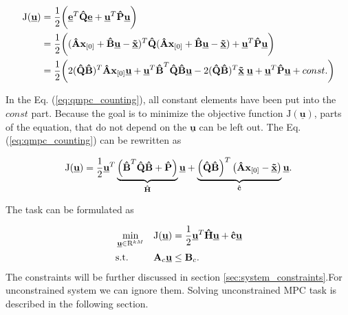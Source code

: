 \documentclass[a4paper,11pt,titlepage]{article}
\newcommand{\uvec}{\textbf{\underline{u}}}
\begin{document}
\begin{equation}
\begin{split}
\label{eq:qmpc_counting}
\mathrm{J}(\underline{\textbf{u}}) 
&= \frac{1}{2}\bigg(\underline{\textbf{e}}^T 
\textbf{\^Q} \underline{\textbf{e}}+\underline{\textbf{u}}^T 
\textbf{\^P} \underline{\textbf{u}}\bigg)\\
&=\frac{1}{2}\bigg((\textbf{\^A}\textbf{x}_{[0]} + \textbf{\^B}	  \uvec-\underline{\textbf{\~x}})^T 
\textbf{\^Q}
(\textbf{\^A}\textbf{x}_{[0]} + \textbf{\^B}\uvec-\underline{\textbf{\~x}}) 
+\underline{\textbf{u}}^T 
\textbf{\^P} \underline{\textbf{u}}\bigg)\\
&=\frac{1}{2}\bigg(
2(\textbf{\^Q}\textbf{\^B})^T \textbf{\^A} \textbf{x}_{[0]} \underline{\textbf{u}}
+\uvec^T \textbf{\^B}^T\textbf{\^Q} \textbf{\^B}\uvec
-2(\textbf{\^Q}\textbf{\^B})^T \underline{\textbf{\~x}}\; \underline{\textbf{u}}
+\underline{\textbf{u}}^T 
\textbf{\^P} \underline{\textbf{u}}+const.\bigg)
\end{split}
\end{equation}

In the Eq. (\ref{eq:qmpc_counting}), all constant elements have been put into the $const$ part. Because the goal is to minimize the objective function $\mathrm{J}(\underline{\textbf{u}})$, parts of the equation, that do not depend on the $\underline{\textbf{u}}$ can be left out. The Eq. (\ref{eq:qmpc_counting}) can be rewritten as

\begin{equation}
\mathrm{J}(\underline{\textbf{u}}) = \frac{1}{2}\uvec^T\underbrace{\left(\textbf{\^B}^T\textbf{\^Q}\textbf{\^B} + \textbf{\^P}\right)}_{\textbf{\^H}}\uvec + \underbrace{\left(\textbf{\^Q}\textbf{\^B}\right)^T\left(\textbf{\^A}\textbf{x}_{[0]} - \textbf{\underline{\~x}}\right)}_{\textbf{\^c}}\uvec.
\label{eq:mpc_objective_large}
\end{equation}

The task can be formulated as

\begin{equation}
\label{eq:qmpc_main_quadratic_form}
\begin{aligned}
& \min_{\uvec \in \mathrm{R}^{kM}}
& & \mathrm{J}(\uvec) = \frac{1}{2}\uvec^T\textbf{\^H}\uvec + \textbf{\^c} \uvec\\
& \text{s.t.}
& & \textbf{A}_c \uvec \leq \textbf{B}_c.
\end{aligned}
\end{equation}
The constraints will be further discussed in section \ref{sec:system_constraints}.For unconstrained system we can ignore them. Solving unconstrained MPC task is described in the following section.
\end{document}
